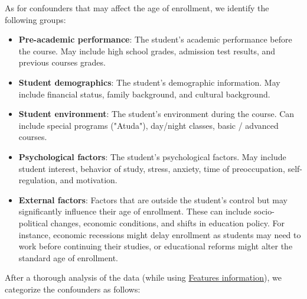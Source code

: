 \documentclass[12pt]{article}
\begin{document}
As for confounders that may affect the age of enrollment, we identify the following groups:
\begin{itemize}
    \item \textbf{Pre-academic performance}: The student's academic performance before the course. May include high school grades, admission test results, and previous courses grades.
    \item \textbf{Student demographics}: The student's demographic information. May include financial status, family background, and cultural background.
    \item \textbf{Student environment}: The student's environment during the course. Can include special programs ("Atuda"), day/night classes, basic / advanced courses.
    \item \textbf{Psychological factors}: The student's psychological factors. May include student interest, behavior of study, stress, anxiety, time of preoccupation, self-regulation, and motivation.
    \item \textbf{External factors}: Factors that are outside the student's control but may significantly influence their age of enrollment. These can include socio-political changes, economic conditions, and shifts in education policy. For instance, economic recessions might delay enrollment as students may need to work before continuing their studies, or educational reforms might alter the standard age of enrollment.
\end{itemize}


After a thorough analysis of the data (while using \href{https://storage.googleapis.com/kaggle-forum-message-attachments/1832313/17922/Features%20information.pdf}{Features information}), we categorize the confounders as follows:
\end{document}
